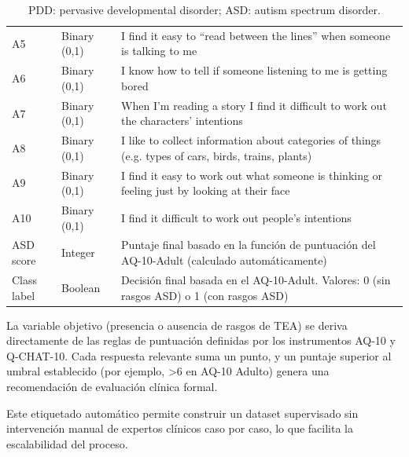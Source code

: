 \begin{table}[htbp]
\begin{tabularx}{\textwidth}{l l X}
A5 & Binary (0,1) & I find it easy to ``read between the lines'' when someone is talking to me \\
A6 & Binary (0,1) & I know how to tell if someone listening to me is getting bored \\
A7 & Binary (0,1) & When I’m reading a story I find it difficult to work out the characters’ intentions \\
A8 & Binary (0,1) & I like to collect information about categories of things (e.g. types of cars, birds, trains, plants) \\
A9 & Binary (0,1) & I find it easy to work out what someone is thinking or feeling just by looking at their face \\
A10 & Binary (0,1) & I find it difficult to work out people’s intentions \\
ASD score & Integer & Puntaje final basado en la función de puntuación del AQ-10-Adult (calculado automáticamente) \\
Class label & Boolean & Decisión final basada en el AQ-10-Adult. Valores: 0 (sin rasgos ASD) o 1 (con rasgos ASD) \\
\bottomrule
\end{tabularx}

\caption*{\footnotesize PDD: pervasive developmental disorder; ASD: autism spectrum disorder.}
\end{table}

La variable objetivo (presencia o ausencia de rasgos de TEA) se deriva directamente de las reglas de puntuación definidas por los instrumentos AQ-10 y Q-CHAT-10. Cada respuesta relevante suma un punto, y un puntaje superior al umbral establecido (por ejemplo, >6 en AQ-10 Adulto) genera una recomendación de evaluación clínica formal.

Este etiquetado automático permite construir un dataset supervisado sin intervención manual de expertos clínicos caso por caso, lo que facilita la escalabilidad del proceso.

